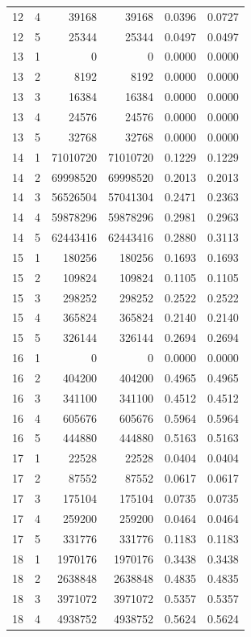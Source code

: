 \begin{longtable}{rrrrrr}
12 & 4 & 39168 & 39168 & 0.0396 & 0.0727 \\
12 & 5 & 25344 & 25344 & 0.0497 & 0.0497 \\
13 & 1 & 0 & 0 & 0.0000 & 0.0000 \\
13 & 2 & 8192 & 8192 & 0.0000 & 0.0000 \\
13 & 3 & 16384 & 16384 & 0.0000 & 0.0000 \\
13 & 4 & 24576 & 24576 & 0.0000 & 0.0000 \\
13 & 5 & 32768 & 32768 & 0.0000 & 0.0000 \\
14 & 1 & 71010720 & 71010720 & 0.1229 & 0.1229 \\
14 & 2 & 69998520 & 69998520 & 0.2013 & 0.2013 \\
14 & 3 & 56526504 & 57041304 & 0.2471 & 0.2363 \\
14 & 4 & 59878296 & 59878296 & 0.2981 & 0.2963 \\
14 & 5 & 62443416 & 62443416 & 0.2880 & 0.3113 \\
15 & 1 & 180256 & 180256 & 0.1693 & 0.1693 \\
15 & 2 & 109824 & 109824 & 0.1105 & 0.1105 \\
15 & 3 & 298252 & 298252 & 0.2522 & 0.2522 \\
15 & 4 & 365824 & 365824 & 0.2140 & 0.2140 \\
15 & 5 & 326144 & 326144 & 0.2694 & 0.2694 \\
16 & 1 & 0 & 0 & 0.0000 & 0.0000 \\
16 & 2 & 404200 & 404200 & 0.4965 & 0.4965 \\
16 & 3 & 341100 & 341100 & 0.4512 & 0.4512 \\
16 & 4 & 605676 & 605676 & 0.5964 & 0.5964 \\
16 & 5 & 444880 & 444880 & 0.5163 & 0.5163 \\
17 & 1 & 22528 & 22528 & 0.0404 & 0.0404 \\
17 & 2 & 87552 & 87552 & 0.0617 & 0.0617 \\
17 & 3 & 175104 & 175104 & 0.0735 & 0.0735 \\
17 & 4 & 259200 & 259200 & 0.0464 & 0.0464 \\
17 & 5 & 331776 & 331776 & 0.1183 & 0.1183 \\
18 & 1 & 1970176 & 1970176 & 0.3438 & 0.3438 \\
18 & 2 & 2638848 & 2638848 & 0.4835 & 0.4835 \\
18 & 3 & 3971072 & 3971072 & 0.5357 & 0.5357 \\
18 & 4 & 4938752 & 4938752 & 0.5624 & 0.5624 \\

\end{longtable}

